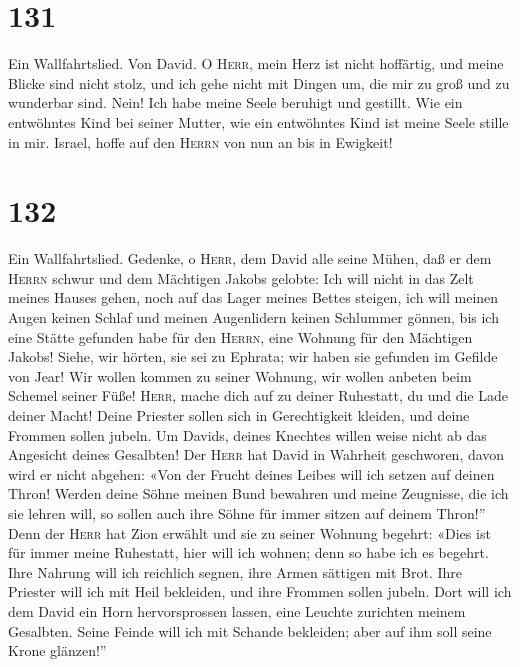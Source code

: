 \hypertarget{section-130}{%
\section{131}\label{section-130}}

 Ein Wallfahrtslied. Von David. O \textsc{Herr}, mein Herz
ist nicht hoffärtig, und meine Blicke sind nicht stolz, und ich gehe
nicht mit Dingen um, die mir zu groß und zu wunderbar sind.
 Nein! Ich habe meine Seele beruhigt und gestillt. Wie ein
entwöhntes Kind bei seiner Mutter, wie ein entwöhntes Kind ist meine
Seele stille in mir.  Israel, hoffe auf den \textsc{Herrn}
von nun an bis in Ewigkeit!

\hypertarget{section-131}{%
\section{132}\label{section-131}}

 Ein Wallfahrtslied. Gedenke, o \textsc{Herr}, dem David
alle seine Mühen,  daß er dem \textsc{Herrn} schwur und
dem Mächtigen Jakobs gelobte:  Ich will nicht in das Zelt
meines Hauses gehen, noch auf das Lager meines Bettes steigen,
 ich will meinen Augen keinen Schlaf und meinen
Augenlidern keinen Schlummer gönnen,  bis ich eine Stätte
gefunden habe für den \textsc{Herrn}, eine Wohnung für den Mächtigen
Jakobs!  Siehe, wir hörten, sie sei zu Ephrata; wir haben
sie gefunden im Gefilde von Jear!  Wir wollen kommen zu
seiner Wohnung, wir wollen anbeten beim Schemel seiner Füße!
 \textsc{Herr}, mache dich auf zu deiner Ruhestatt, du und
die Lade deiner Macht!  Deine Priester sollen sich in
Gerechtigkeit kleiden, und deine Frommen sollen jubeln. 
Um Davids, deines Knechtes willen weise nicht ab das Angesicht deines
Gesalbten!  Der \textsc{Herr} hat David in Wahrheit
geschworen, davon wird er nicht abgehen: «Von der Frucht deines Leibes
will ich setzen auf deinen Thron!  Werden deine Söhne
meinen Bund bewahren und meine Zeugnisse, die ich sie lehren will, so
sollen auch ihre Söhne für immer sitzen auf deinem Thron!''
 Denn der \textsc{Herr} hat Zion erwählt und sie zu
seiner Wohnung begehrt:  «Dies ist für immer meine
Ruhestatt, hier will ich wohnen; denn so habe ich es begehrt.
 Ihre Nahrung will ich reichlich segnen, ihre Armen
sättigen mit Brot.  Ihre Priester will ich mit Heil
bekleiden, und ihre Frommen sollen jubeln.  Dort will ich
dem David ein Horn hervorsprossen lassen, eine Leuchte zurichten meinem
Gesalbten.  Seine Feinde will ich mit Schande bekleiden;
aber auf ihm soll seine Krone glänzen!''

